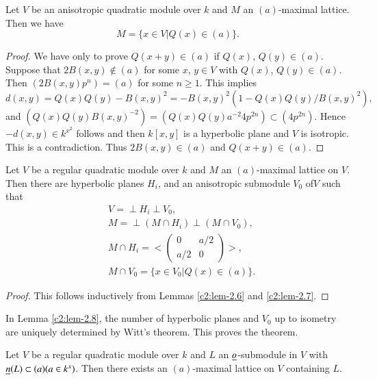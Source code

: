 \begin{lemma}\label{c2:lem-2.7}
Let $V$ be an anisotropic quadratic module over $k$ and $M$ an
$(a)$-maximal lattice. Then we have
$$
M=\{x\in V|Q(x)\in(a)\}.
$$
\end{lemma}

\begin{proof}
We have only to prove $Q(x+y)\in(a)$ if $Q(x)$, $Q(y)\in(a)$. Suppose
that $2B(x,y)\not\in(a)$ for some $x$, $y\in V$ with $Q(x)$,
$Q(y)\in(a)$. Then $(2B(x,y)p^{n})=(a)$ for some $n\geq 1$. This
implies
$$
d(x,y)=Q(x)Q(y)-B(x,y)^{2}=-B(x,y)^{2}(1-Q(x)Q(y)/B(x,y)^{2}),
$$
and $(Q(x)Q(y)B(x,y)^{-2})=(Q(x)Q(y)a^{-2}4p^{2n})\subset
(4p^{2n})$. Hence\break $-d(x,y)\in k^{x^{2}}$ follows and then $k[x,y]$
is a hyperbolic plane and $V$ is isotropic. This is a
contradiction. Thus $2B(x,y)\in (a)$ and $Q(x+y)\in(a)$.
\end{proof}

\begin{lemma}\label{c2:lem-2.8}
Let $V$ be a regular quadratic module over $k$ and $M$ an
$(a)$-maximal lattice on $V$. Then there are hyperbolic planes
$H_{i}$, and an anisotropic submodule $V_{0}$ of\pageoriginale $V$
such that
\begin{align*}
& V = \perp H_{i}\perp V_{0},\\
& M = \perp (M\cap H_{i})\perp (M\cap V_{0}),\\
& M \cap H_{i}=<
\begin{pmatrix}
0 & a/2\\
a/2 & 0
\end{pmatrix}>,\\
& M\cap V_{0}=\{x\in V_{0}|Q(x)\in (a)\}.
\end{align*}
\end{lemma}

\begin{proof}
This follows inductively from Lemmas \ref{c2:lem-2.6} and \ref{c2:lem-2.7}.
\end{proof}

In Lemma \ref{c2:lem-2.8}, the number of hyperbolic planes and $V_{0}$ up
to isometry are uniquely determined by Witt's theorem. This proves the
theorem.

\begin{lemma}\label{c2:lem-2.9}
Let $V$ be a regular quadratic module over $k$ and $L$ an
$\underline{o}$-submodule in $V$ with $\underline{n}(L)\subset (a)(a\in
k^{x})$. Then there exists an $(a)$-maximal lattice on $V$
containing $L$.
\end{lemma}

